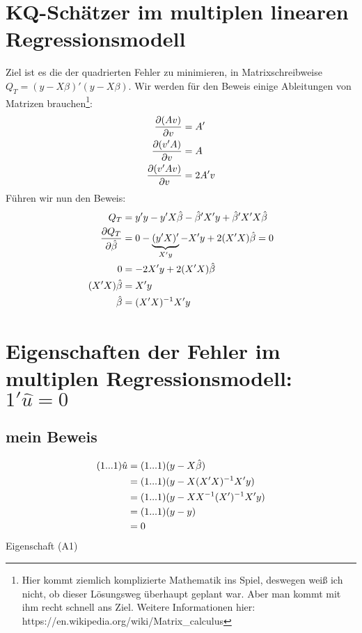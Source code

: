 \documentclass{article}
\begin{document}
	\section{KQ-Schätzer im multiplen linearen Regressionsmodell}
	Ziel ist es die der quadrierten Fehler zu minimieren, in Matrixschreibweise $Q_T=(y-X\beta)'(y-X\beta)$. Wir werden für den Beweis einige Ableitungen von Matrizen brauchen\footnote{Hier kommt ziemlich komplizierte Mathematik ins Spiel, deswegen weiß ich nicht, ob dieser Lösungsweg überhaupt geplant war. Aber man kommt mit ihm recht schnell ans Ziel. Weitere Informationen hier: https://en.wikipedia.org/wiki/Matrix\_calculus}:
	\begin{align}
		\frac{\partial (Av)}{\partial v} &= A' \notag \\
		\frac{\partial (v'A)}{\partial v} &= A \notag \\
		\frac{\partial (v'Av)}{\partial v} &= 2A'v \notag
	\end{align}
	Führen wir nun den Beweis:
	\begin{align}
		Q_T &= y'y - y'X\hat{\beta} - \hat{\beta}'X'y + \hat{\beta}'X'X\hat{\beta} \notag \\
		\frac{\partial Q_T}{\partial \hat{\beta}} &= 0 - \underbrace{(y'X)'}_{X'y} - X'y + 2(X'X)\hat{\beta} = 0 \notag \\
		0 &= -2X'y + 2(X'X)\hat{\beta} \notag \\
		(X'X)\hat{\beta} &= X'y \notag \\
		\hat{\beta} &= (X'X)^{-1}X'y \notag
	\end{align}

	\section{Eigenschaften der Fehler im multiplen Regressionsmodell: $1'\hat{u}=0$}
	\subsection{mein Beweis}
	\begin{align}
		(1 ... 1)\hat{u} &= (1 ... 1)(y-X\hat{\beta}) \notag \\
		&= (1...1)(y-X(X'X)^{-1}X'y) \notag \\
		&= (1...1)(y-XX^{-1}(X')^{-1}X'y) \notag \\
		&= (1...1)(y-y) \notag \\
		&= 0 \notag
	\end{align}
	Eigenschaft (A1)
	
\end{document}
